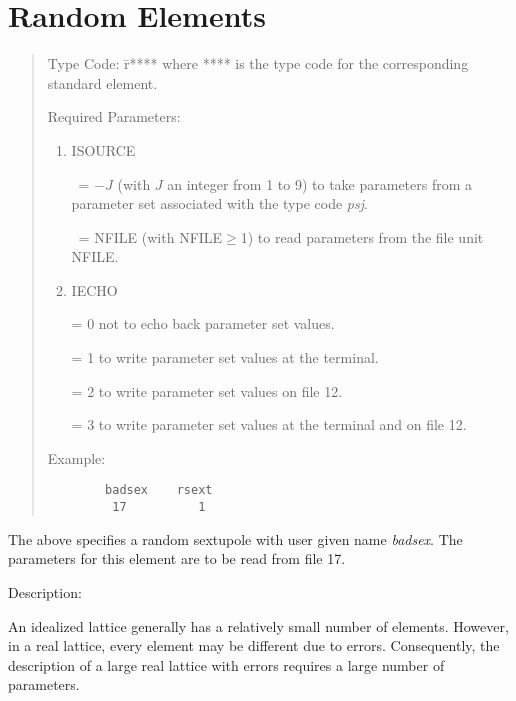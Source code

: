 \section{Random Elements}
\begin{quotation}
\begin{tabbing}
\noindent     Type Code:  \=r**** where **** is the type code for the corresponding\\
                          \>standard element.
\end{tabbing}
\vspace{5mm}

\noindent     Required Parameters:
\begin{enumerate}
      \item  ISOURCE

             \ = $-J$ (with $J$ an integer from 1 to 9) to take parameters from
             a parameter  \hspace*{1.5em}set associated with the type code {\em psj}.

             \ = NFILE (with NFILE$\geq$1) to read parameters from the file unit NFILE.

      \item  IECHO

             = 0 not to echo back parameter set values.

             = 1 to write parameter set values at the terminal.

             = 2 to write parameter set values on file 12.

             = 3 to write parameter set values at the terminal
			 and on file 12.
\end{enumerate}

\vspace{5mm}
\noindent Example:
\begin{verbatim}
        badsex    rsext
         17          1
\end{verbatim}
\end{quotation}
The above specifies a random sextupole with user given name {\em badsex}.  The
parameters for this element are to be read from file 17.

\vspace{5mm}
     Description:
\vspace{2mm}

         An idealized lattice generally has a relatively small number of
elements.  However, in a real lattice, every element may be different due
to errors.  Consequently, the description of a large real lattice with
errors requires a large number of parameters.

